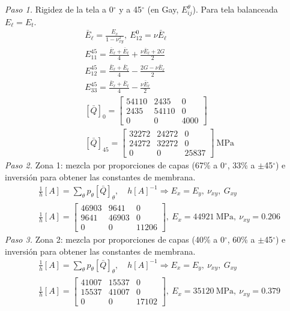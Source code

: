 \documentclass[11pt]{article}
\begin{document}
\textit{Paso 1.} Rigidez de la tela a 0\ensuremath{^\circ} y a 45\ensuremath{^\circ} (en Gay, $E_{ij}^{\theta}$). Para tela balanceada $E_\ell=E_t$.
\begin{align*}
&\bar E_\ell=\frac{E_x}{1-\nu_{xy}^2},\ E^{0}_{12}=\nu\bar E_\ell \\
&E^{45}_{11}=\frac{\bar E_\ell+\bar E_t}{4}+\frac{\nu\bar E_\ell+2G}{2} \\
&E^{45}_{12}=\frac{\bar E_\ell+\bar E_t}{4}-\frac{2G-\nu\bar E_\ell}{2} \\
&E^{45}_{33}=\frac{\bar E_\ell+\bar E_t}{4}-\frac{\nu\bar E_\ell}{2} \\
&[\bar Q]_{0}=\begin{bmatrix}54110 & 2435 & 0 \\ 2435 & 54110 & 0 \\ 0 & 0 & 4000\end{bmatrix} \\
&[\bar Q]_{45}=\begin{bmatrix}32272 & 24272 & 0 \\ 24272 & 32272 & 0 \\ 0 & 0 & 25837\end{bmatrix}\ \mathrm{MPa}
\end{align*}
\textit{Paso 2.} Zona 1: mezcla por proporciones de capas (67\% a 0\ensuremath{^\circ}, 33\% a \ensuremath{\pm}45\ensuremath{^\circ}) e inversión para obtener las constantes de membrana.
\begin{align*}
&\tfrac1h[A]=\sum_\theta p_\theta[\bar Q]_\theta,\quad h[A]^{-1}\Rightarrow E_x=E_y,\ \nu_{xy},\ G_{xy} \\
&\tfrac1h[A]=\begin{bmatrix}46903 & 9641 & 0 \\ 9641 & 46903 & 0 \\ 0 & 0 & 11206\end{bmatrix},\ E_x=44921\ \mathrm{MPa},\ \nu_{xy}=0.206
\end{align*}
\textit{Paso 3.} Zona 2: mezcla por proporciones de capas (40\% a 0\ensuremath{^\circ}, 60\% a \ensuremath{\pm}45\ensuremath{^\circ}) e inversión para obtener las constantes de membrana.
\begin{align*}
&\tfrac1h[A]=\sum_\theta p_\theta[\bar Q]_\theta,\quad h[A]^{-1}\Rightarrow E_x=E_y,\ \nu_{xy},\ G_{xy} \\
&\tfrac1h[A]=\begin{bmatrix}41007 & 15537 & 0 \\ 15537 & 41007 & 0 \\ 0 & 0 & 17102\end{bmatrix},\ E_x=35120\ \mathrm{MPa},\ \nu_{xy}=0.379
\end{align*}
\end{document}

